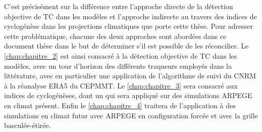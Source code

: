 \documentclass[../main.tex]{subfiles}
\begin{document}
C'est précisément sur la différence entre l'approche directe de la détection objective de TC dans les modèles et l'approche indirecte au travers des indices de
cyclogénèse dans les projections climatiques que porte cette thèse. Pour adresser cette problématique, chacune des deux approches sont abordées dans ce document
thèse dans le but de déterminer s'il est possible de les réconcilier. Le \cref{chap:chapitre_2} est ainsi consacré à la détection objective de TC dans les
modèles, avec un tour d'horizon des différents traqueurs employés dans la littérature, avec en particulier une application de l'algorithme de suivi du CNRM à la
réanalyse ERA5 du CEPMMT. Le \cref{chap:chapitre_3} sera consacré aux indices de cyclogénèses, dont un qui sera appliqué sur des simulations ARPEGE en climat
présent. Enfin le \cref{chap:chapitre_4} traitera de l'application à des simulations en climat futur avec ARPEGE en configuration forcée et avec la grille
basculée-étirée.
\end{document}
